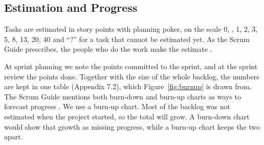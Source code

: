 
\subsection{Estimation and Progress}\label{sec:method-progress}

Tasks are estimated in story points with planning poker, on the scale 0, \textonehalf,
1, 2, 3, 5, 8, 13, 20, 40 and ``?'' for a task that cannot be estimated yet. As the
Scrum Guide prescribes, the people who do the work make the estimate
\cite[p.~14]{schwaber-scrum-guide-2016}.

At sprint planning we note the points committed to the sprint, and at the sprint
review the points done. Together with the size of the whole backlog, the numbers are
kept in one table (Appendix 7.2), which Figure~\ref{fig:burnup} is drawn from. The
Scrum Guide mentions both burn-down and burn-up charts as ways to forecast progress
\cite[p.~14]{schwaber-scrum-guide-2016}. We use a burn-up chart. Most of the backlog
was not estimated when the project started, so the total will grow. A burn-down chart
would show that growth as missing progress, while a burn-up chart keeps the two apart.

